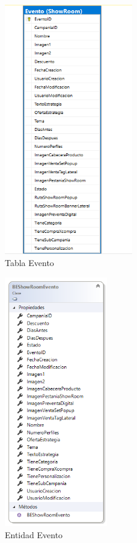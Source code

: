 \documentclass[a4paper,11pt]{paper}
\begin{document}
\newpage
\begin{figure}[h]
\centering
\includegraphics[width=0.5\textwidth]{imgs/Eventos/Tabla.png}
\caption{Tabla Evento}
\end{figure}

\newpage
\begin{figure}[h]
\centering
\includegraphics[width=0.4\textwidth]{imgs/Eventos/ClaseEvento.png}
\caption{Entidad Evento}
\end{figure}
\end{document}
